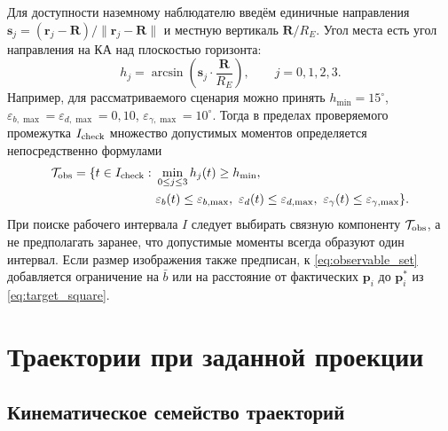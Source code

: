 \documentclass[a4paper,12pt]{article}
\begin{document}
Для доступности наземному наблюдателю введём единичные направления
$\mathbf s_j=(\mathbf r_j-\mathbf R)/\|\mathbf r_j-\mathbf R\|$
и местную вертикаль $\mathbf R/R_E$. Угол места есть угол направления
на КА над плоскостью горизонта:
\begin{equation}
 h_j=\arcsin\!\left(\mathbf s_j\cdot\frac{\mathbf R}{R_E}\right),
 \qquad j=0,1,2,3.
 \label{eq:elevation}
\end{equation}
Например, для рассматриваемого сценария можно принять
$h_{\min}=15^\circ$,
$\varepsilon_{b,\max}=\varepsilon_{d,\max}=0{,}10$,
$\varepsilon_{\gamma,\max}=10^\circ$. Тогда в пределах
проверяемого промежутка $I_{\rm check}$ множество допустимых
моментов определяется непосредственно формулами
\begin{equation}
\begin{split}
 \mathcal T_{\rm obs}=\{t\in I_{\rm check}:\ &
 \min_{0\leq j\leq3} h_j(t)\geq h_{\min},\\
 &\varepsilon_b(t)\leq\varepsilon_{b,\max},\
 \varepsilon_d(t)\leq\varepsilon_{d,\max},\
 \varepsilon_\gamma(t)\leq\varepsilon_{\gamma,\max}\}.
\end{split}
\label{eq:observable_set}
\end{equation}
При поиске рабочего интервала $I$ следует выбирать связную
компоненту $\mathcal T_{\rm obs}$, а не предполагать заранее,
что допустимые моменты всегда образуют один интервал.
Если размер изображения также предписан, к
\eqref{eq:observable_set} добавляется ограничение на $\bar b$
или на расстояние от фактических $\mathbf p_i$ до
$\mathbf p_i^*$ из \eqref{eq:target_square}.

\section{Траектории при заданной проекции}

\subsection{Кинематическое семейство траекторий}
\end{document}
